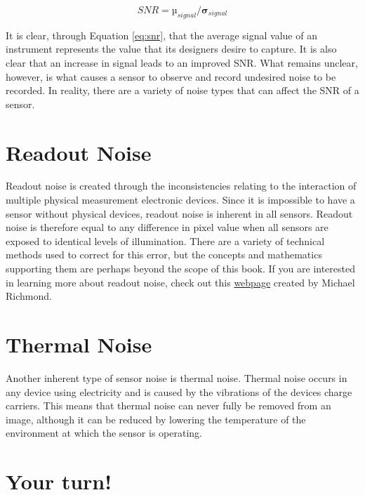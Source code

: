 \documentclass[
]{book}
\begin{document}
\begin{equation}
SNR = µ _{signal} /𝛔 _{signal}
\label{eq:snr}
\end{equation}

It is clear, through Equation \eqref{eq:snr}, that the average signal
value of an instrument represents the value that its designers desire to
capture. It is also clear that an increase in signal leads to an
improved SNR. What remains unclear, however, is what causes a sensor to
observe and record undesired noise to be recorded. In reality, there are
a variety of noise types that can affect the SNR of a sensor.

\hypertarget{readout-noise}{%
\section{Readout Noise}\label{readout-noise}}

Readout noise is created through the inconsistencies relating to the
interaction of multiple physical measurement electronic devices. Since
it is impossible to have a sensor without physical devices, readout
noise is inherent in all sensors. Readout noise is therefore equal to
any difference in pixel value when all sensors are exposed to identical
levels of illumination. There are a variety of technical methods used to
correct for this error, but the concepts and mathematics supporting them
are perhaps beyond the scope of this book. If you are interested in
learning more about readout noise, check out this
\href{http://spiff.rit.edu/classes/phys445/lectures/readout/readout.html}{webpage}
created by Michael Richmond.

\hypertarget{thermal-noise}{%
\section{Thermal Noise}\label{thermal-noise}}

Another inherent type of sensor noise is thermal noise. Thermal noise
occurs in any device using electricity and is caused by the vibrations
of the devices charge carriers. This means that thermal noise can never
fully be removed from an image, although it can be reduced by lowering
the temperature of the environment at which the sensor is operating.

\hypertarget{your-turn-9}{%
\section*{Your turn!}\label{your-turn-9}}
\end{document}
